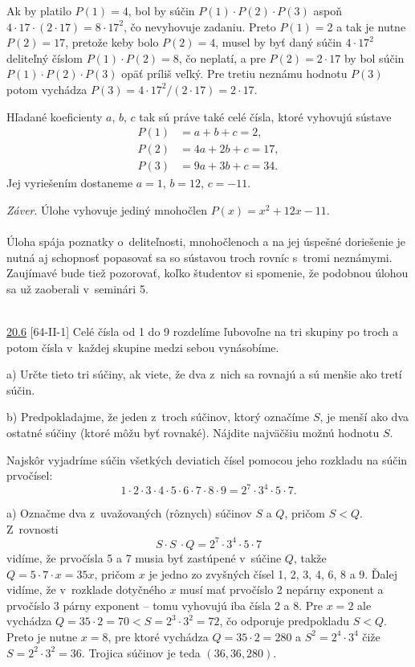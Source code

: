 Ak by platilo $P(1) = 4$, bol by súčin $P(1)\cdot P(2)\cdot P(3)$ aspoň $4 \cdot 17 \cdot (2 \cdot 17) = 8 \cdot 17^2$, čo nevyhovuje zadaniu. Preto $P(1) = 2$ a tak je nutne $P(2) = 17$, pretože keby bolo $P(2) = 4$, musel by byť daný súčin $4 \cdot 17^2$ deliteľný číslom $P(1)\cdot P(2) = 8$, čo neplatí, a pre $P(2) = 2 \cdot 17$ by bol súčin $P(1)\cdot P(2)\cdot P(3)$ opäť príliš veľký. Pre tretiu neznámu
hodnotu $P(3)$ potom vychádza $P(3) = 4 \cdot 17^2 /(2 \cdot 17) = 2 \cdot 17$.

Hľadané koeficienty $a$, $b$, $c$ tak sú práve také celé čísla, ktoré vyhovujú sústave
\begin{align*}
P(1) &= a + b + c = 2,\\
P(2) &= 4a + 2b + c = 17,\\
P(3) &= 9a + 3b + c = 34.
\end{align*}
Jej vyriešením dostaneme $a = 1$, $b = 12$, $c = -11$.

\textit{Záver}. Úlohe vyhovuje jediný mnohočlen $P(x) = x^2 + 12x - 11$.\\
\\
\kom Úloha spája poznatky o~deliteľnosti, mnohočlenoch a na jej úspešné doriešenie je nutná aj schopnosť popasovať sa so sústavou troch rovníc s~tromi neznámymi. Zaujímavé bude tiež pozorovať, koľko študentov si spomenie, že podobnou úlohou sa už zaoberali v~seminári 5.\\
\\
\begin{tcolorbox}[breakable,notitle,boxrule=0pt,colback=light-gray,colframe=light-gray]\ul{20.6} [64-II-1]
Celé čísla od 1 do 9 rozdelíme ľubovoľne na tri skupiny po troch a potom čísla v~každej skupine medzi sebou vynásobíme.

a) Určte tieto tri súčiny, ak viete, že dva z~nich sa rovnajú a sú menšie ako tretí súčin.

b) Predpokladajme, že jeden z~troch súčinov, ktorý označíme $S$, je menší ako dva ostatné súčiny (ktoré môžu byť rovnaké). Nájdite najväčšiu možnú hodnotu $S$.

\end{tcolorbox}

\rieh Najskôr vyjadríme súčin všetkých deviatich čísel pomocou jeho rozkladu na súčin prvočísel:
$$ 1 \cdot 2 \cdot 3 \cdot 4 \cdot 5 \cdot 6 \cdot 7 \cdot 8 \cdot 9 = 2^7 \cdot 3^4 \cdot 5 \cdot 7.$$

a) Označme dva z~uvažovaných (rôznych) súčinov $S$ a $Q$, pričom $S < Q$. Z~rovnosti
$$S \cdot S~\cdot Q = 2^7 \cdot 3^4 \cdot 5 \cdot 7$$
vidíme, že prvočísla 5 a 7 musia byť zastúpené v~súčine $Q$, takže $Q = 5 \cdot 7 \cdot x = 35x$, pričom $x$ je jedno zo zvyšných čísel 1, 2, 3, 4, 6, 8 a 9. Ďalej vidíme, že v~rozklade dotyčného $x$ musí mať prvočíslo 2 nepárny exponent a prvočíslo 3 párny exponent -- tomu vyhovujú iba čísla 2 a 8. Pre $x = 2$ ale vychádza $Q = 35 \cdot 2 = 70 < S= 2^3 \cdot 3^2 = 72$, čo odporuje predpokladu $S < Q$. Preto je nutne $x = 8$, pre ktoré vychádza $Q = 35 \cdot 2 = 280$ a $S^2 = 2^4 \cdot 3^4$ čiže $S = 2^2 \cdot 3^2 = 36$. Trojica súčinov je teda
$(36, 36, 280)$.

